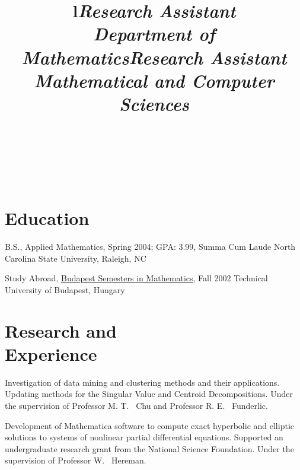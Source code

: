 \documentclass[margin,line,11pt,draft]{res}
\begin{document}
\begin{resume}
\begin{format}
\title{l}\\
\\
\body\\
\end{format}


\section{\sc Education}
B.S., Applied Mathematics, Spring 2004; GPA: 3.99, Summa Cum Laude \newline
North Carolina State University, Raleigh, NC

Study Abroad, \href{http://www.stolaf.edu/depts/math/budapest/}
{Budapest Semesters in Mathematics}, Fall 2002 \newline
Technical University of Budapest, Hungary


\section{\sc Research and \\Experience}

\title{\em Research Assistant \\ Department of Mathematics}
\location{}
\begin{position}
Investigation of data mining and clustering methods and their
applications. Updating methods for the Singular Value and Centroid
Decompositions. Under the supervision of Professor M. T. \ Chu and
Professor R. E. \ Funderlic.
\end{position}

\title{\em Research Assistant \\ Mathematical and Computer Sciences}
\location{}
\begin{position}
Development of Mathematica software to compute exact hyperbolic and
elliptic solutions to systems of nonlinear partial differential
equations. Supported an undergraduate research grant from the National
Science Foundation.  Under the supervision of Professor W. \ Hereman.
\end{position}


\end{resume}
\end{document}
